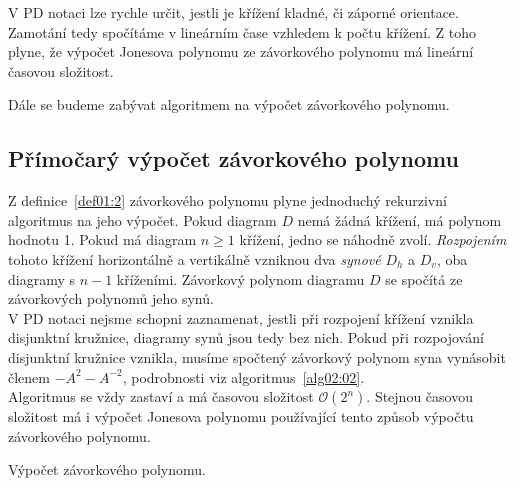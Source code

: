 V PD notaci lze rychle určit, jestli je křížení kladné, či záporné orientace. Zamotání tedy spočítáme v lineárním čase vzhledem k počtu křížení. Z toho plyne, že výpočet Jonesova polynomu ze závorkového polynomu má lineární časovou složitost.

Dále se budeme zabývat algoritmem na výpočet závorkového polynomu. 

\subsection{Přímočarý výpočet závorkového polynomu}

Z definice~\ref{def01:2} závorkového polynomu plyne jednoduchý rekurzivní algoritmus na jeho výpočet. Pokud diagram $D$ nemá žádná křížení, má polynom hodnotu 1. Pokud má diagram $n\geq 1$ křížení, jedno se náhodně zvolí. \emph{Rozpojením} tohoto křížení horizontálně a vertikálně vzniknou dva \emph{synové} $D_h$ a $D_v$, oba diagramy s $n-1$ kříženími. Závorkový polynom diagramu $D$ se spočítá ze závorkových polynomů jeho synů.
\\
V PD notaci nejsme schopni zaznamenat, jestli při rozpojení křížení vznikla disjunktní kružnice, diagramy synů jsou tedy bez nich. Pokud při rozpojování disjunktní kružnice vznikla, musíme spočtený závorkový polynom syna vynásobit členem $-A^2 - A^{-2}$, podrobnosti viz algoritmus~\ref{alg02:02}.
\\
Algoritmus se vždy zastaví a má časovou složitost $\mathcal{O}(2^n)$. Stejnou časovou složitost má i výpočet Jonesova polynomu používající tento způsob výpočtu závorkového polynomu. 


\begin{algorithm}[p]

\caption{Výpočet závorkového polynomu.}
\label{alg02:02}

\DontPrintSemicolon

%




\end{algorithm}

